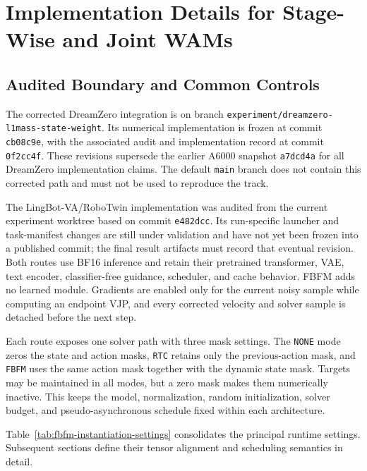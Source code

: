
\section{Implementation Details for Stage-Wise and Joint WAMs}
\label{app:implementation}
\label{app:lingbot-integration}

\subsection{Audited Boundary and Common Controls}

The corrected DreamZero integration is on branch
\texttt{experiment/dreamzero-l1mass-state-weight}. Its numerical implementation
is frozen at commit \texttt{cb08c9e}, with the associated audit and
implementation record at commit \texttt{0f2cc4f}. These revisions supersede the
earlier A6000 snapshot \texttt{a7dcd4a} for all DreamZero implementation claims.
The default \texttt{main} branch does not contain this corrected path and must
not be used to reproduce the track.

The LingBot-VA/RoboTwin implementation was audited from the current experiment
worktree based on commit \texttt{e482dcc}. Its run-specific launcher and
task-manifest changes are still under validation and have not yet been frozen
into a published commit; the final result artifacts must record that eventual
revision. Both routes use BF16 inference and retain their pretrained
transformer, VAE, text encoder, classifier-free guidance, scheduler, and cache
behavior. FBFM adds no learned module. Gradients are enabled only for the
current noisy sample while computing an endpoint VJP, and every corrected
velocity and solver sample is detached before the next step.

Each route exposes one solver path with three mask settings. The \texttt{NONE}
mode zeros the state and action masks, \texttt{RTC} retains only the
previous-action mask, and \texttt{FBFM} uses the same action mask together with
the dynamic state mask. Targets may be maintained in all modes, but a zero mask
makes them numerically inactive. This keeps the model, normalization, random
initialization, solver budget, and pseudo-asynchronous schedule fixed within
each architecture.

Table~\ref{tab:fbfm-instantiation-settings} consolidates the principal runtime
settings. Subsequent sections define their tensor alignment and scheduling
semantics in detail.

